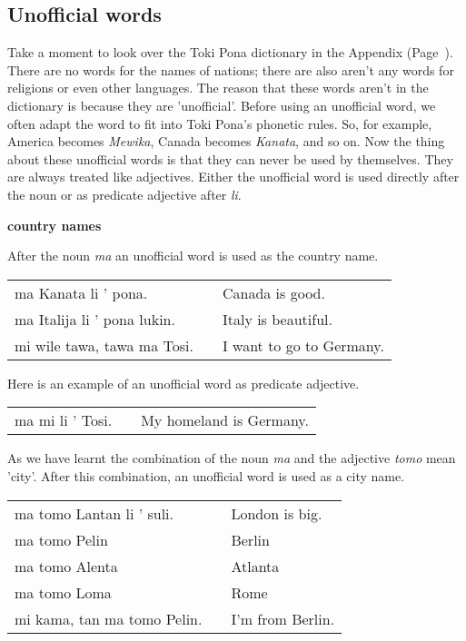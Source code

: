 \subsection*{Unofficial words}
%
Take a moment to look over the Toki Pona dictionary in the Appendix (Page~\pageref{'unofficial_words'}).
There are no words for the names of nations; there are also aren't any words for religions or even other languages.
The reason that these words aren't in the dictionary is because they are 'unofficial'.
Before using an unofficial word, we often adapt the word to fit into Toki Pona's phonetic rules.
So, for example, America becomes \textit{Mewika}, Canada becomes \textit{Kanata}, and so on.
Now the thing about these unofficial words is that they can never be used by themselves.
They are always treated like adjectives.
Either the unofficial word is used directly after the noun or as predicate adjective after \textit{li}.

\textbf{country names}

After the noun \textit{ma} an unofficial word is used as the country name.

\begin{supertabular}{p{5,5cm}|ll}
    ma Kanata li ' pona.        &  & Canada is good.          \\
    ma Italija li ' pona lukin. &  & Italy is beautiful.      \\
    mi wile tawa, tawa ma Tosi. &  & I want to go to Germany. \\
\end{supertabular}

Here is an example of an unofficial word as predicate adjective.

\begin{supertabular}{p{5,5cm}|ll}
    ma mi li ' Tosi. &  & My homeland is Germany. \\
\end{supertabular}

As we have learnt the combination of the noun \textit{ma} and the adjective \textit{tomo} mean 'city'.
After this combination, an unofficial word is used as a city name.

\begin{supertabular}{p{5,5cm}|ll}
    ma tomo Lantan li ' suli.   &  & London is big.   \\
    ma tomo Pelin               &  & Berlin           \\
    ma tomo Alenta              &  & Atlanta          \\
    ma tomo Loma                &  & Rome             \\
    mi kama, tan ma tomo Pelin. &  & I'm from Berlin. \\
\end{supertabular}

